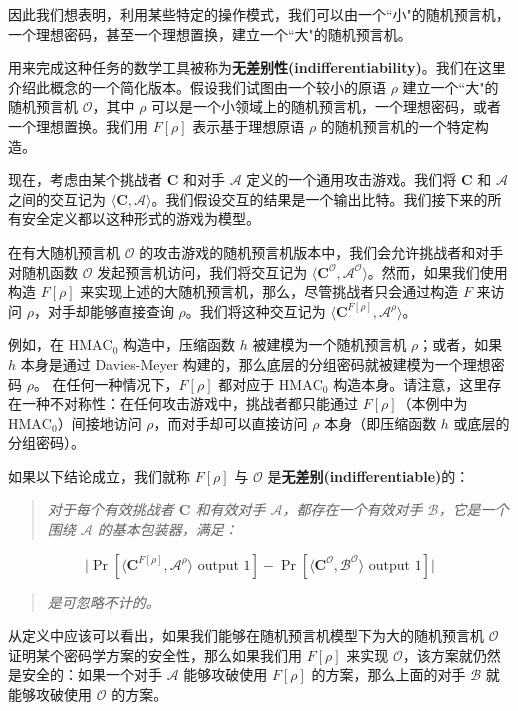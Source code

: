 因此我们想表明，利用某些特定的操作模式，我们可以由一个``小"的随机预言机，一个理想密码，甚至一个理想置换，建立一个``大"的随机预言机。

用来完成这种任务的数学工具被称为\textbf{无差别性(indifferentiability)}。我们在这里介绍此概念的一个简化版本。假设我们试图由一个较小的原语 $\rho$ 建立一个``大"的随机预言机 $\mathcal{O}$，其中 $\rho$ 可以是一个小领域上的随机预言机，一个理想密码，或者一个理想置换。我们用 $F[\rho]$ 表示基于理想原语 $\rho$ 的随机预言机的一个特定构造。

现在，考虑由某个挑战者 $\mathbf{C}$ 和对手 $\mathcal{A}$ 定义的一个通用攻击游戏。我们将 $\mathbf{C}$ 和 $\mathcal{A}$ 之间的交互记为 $\langle\mathbf{C},\mathcal{A}\rangle$。我们假设交互的结果是一个输出比特。我们接下来的所有安全定义都以这种形式的游戏为模型。

在有大随机预言机 $\mathcal{O}$ 的攻击游戏的随机预言机版本中，我们会允许挑战者和对手对随机函数 $\mathcal{O}$ 发起预言机访问，我们将交互记为 $\langle\mathbf{C}^\mathcal{O},\mathcal{A}^\mathcal{O}\rangle$。然而，如果我们使用构造 $F[\rho]$ 来实现上述的大随机预言机，那么，尽管挑战者只会通过构造 $F$ 来访问 $\rho$，对手却能够直接查询 $\rho$。我们将这种交互记为 $\langle\mathbf{C}^{F[\rho]},\mathcal{A}^\rho\rangle$。

例如，在 $\mathrm{HMAC}_0$ 构造中，压缩函数 $h$ 被建模为一个随机预言机 $\rho$；或者，如果 $h$ 本身是通过 Davies-Meyer 构建的，那么底层的分组密码就被建模为一个理想密码 $\rho$。 在任何一种情况下，$F[\rho]$ 都对应于 $\mathrm{HMAC}_0$ 构造本身。请注意，这里存在一种不对称性：在任何攻击游戏中，挑战者都只能通过 $F[\rho]$（本例中为 $\mathrm{HMAC}_0$）间接地访问 $\rho$，而对手却可以直接访问 $\rho$ 本身（即压缩函数 $h$ 或底层的分组密码）。

如果以下结论成立，我们就称 $F[\rho]$ 与 $\mathcal{O}$ 是\textbf{无差别(indifferentiable)}的：
\begin{quote}
\emph{对于每个有效挑战者 $\mathbf{C}$ 和有效对手 $\mathcal{A}$，都存在一个有效对手 $\mathcal{B}$，它是一个围绕 $\mathcal{A}$ 的基本包装器，满足：}
\end{quote}
\[
\big\lvert
\Pr[\langle\mathbf{C}^{F[\rho]},\mathcal{A}^\rho\rangle \text{ output } 1]
-
\Pr[\langle\mathbf{C}^\mathcal{O},\mathcal{B}^\mathcal{O}\rangle  \text{ output } 1]
\big\rvert
\]
\begin{quote}
\emph{是可忽略不计的。}
\end{quote}

从定义中应该可以看出，如果我们能够在随机预言机模型下为大的随机预言机 $\mathcal{O}$ 证明某个密码学方案的安全性，那么如果我们用 $F[\rho]$ 来实现 $\mathcal{O}$，该方案就仍然是安全的：如果一个对手 $\mathcal{A}$ 能够攻破使用 $F[\rho]$ 的方案，那么上面的对手 $\mathcal{B}$ 就能够攻破使用 $\mathcal{O}$ 的方案。

